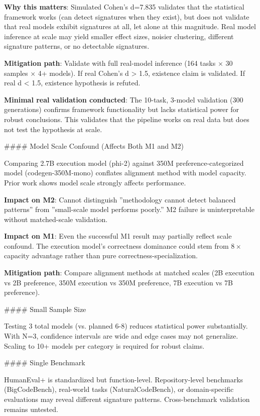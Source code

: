 \textbf{Why this matters}: Simulated Cohen's d=7.835 validates that the statistical framework works (can detect signatures when they exist), but does not validate that real models exhibit signatures at all, let alone at this magnitude. Real model inference at scale may yield smaller effect sizes, noisier clustering, different signature patterns, or no detectable signatures.

\textbf{Mitigation path}: Validate with full real-model inference (164 tasks $\times$ 30 samples $\times$ 4+ models). If real Cohen's d > 1.5, existence claim is validated. If real d < 1.5, existence hypothesis is refuted.

\textbf{Minimal real validation conducted}: The 10-task, 3-model validation (300 generations) confirms framework functionality but lacks statistical power for robust conclusions. This validates that the pipeline works on real data but does not test the hypothesis at scale.

\#\#\#\# Model Scale Confound (Affects Both M1 and M2)

Comparing 2.7B execution model (phi-2) against 350M preference-categorized model (codegen-350M-mono) conflates alignment method with model capacity. Prior work shows model scale strongly affects performance.

\textbf{Impact on M2}: Cannot distinguish ''methodology cannot detect balanced patterns'' from ''small-scale model performs poorly.'' M2 failure is uninterpretable without matched-scale validation.

\textbf{Impact on M1}: Even the successful M1 result may partially reflect scale confound. The execution model's correctness dominance could stem from $8\times$ capacity advantage rather than pure correctness-specialization.

\textbf{Mitigation path}: Compare alignment methods at matched scales (2B execution vs 2B preference, 350M execution vs 350M preference, 7B execution vs 7B preference).

\#\#\#\# Small Sample Size

Testing 3 total models (vs. planned 6-8) reduces statistical power substantially. With N=3, confidence intervals are wide and edge cases may not generalize. Scaling to 10+ models per category is required for robust claims.

\#\#\#\# Single Benchmark

HumanEval+ is standardized but function-level. Repository-level benchmarks (BigCodeBench), real-world tasks (NaturalCodeBench), or domain-specific evaluations may reveal different signature patterns. Cross-benchmark validation remains untested.

